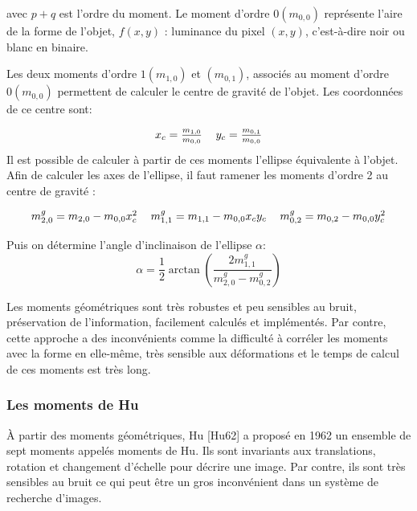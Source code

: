 avec $p+q$ est l'ordre du moment. Le moment d’ordre $0 (m_{0,0})$  représente l’aire de la forme de l'objet, $f(x, y)$ : luminance du pixel $(x, y)$, c’est-à-dire noir ou blanc en binaire.

Les deux moments d'ordre $1 (m_{1,0})$ et $(m_{0,1})$, associés au moment d’ordre $0 (m_{0,0})$ permettent de calculer le centre de gravité de l'objet. Les coordonnées de ce
centre sont:

\begin{equation}
		\begin{tabular}{cc}
		$x_{c} = \frac{m_{1,0}}{m_{0,0}}$ & $y_{c} = \frac{m_{0,1}}{m_{0,0}}$
		\end{tabular}
\end{equation}
Il est possible de calculer à partir de ces moments l’ellipse équivalente à l’objet. Afin de calculer les axes de l’ellipse, il faut ramener les moments d’ordre 2 au centre de gravité :

\begin{equation}
\begin{tabular}{ccc}
$m_{2, 0}^g = m_{2,0} - m_{0,0} x_{c}^2$ & $m_{1,1}^g = m_{1,1} - m_{0,0} x_{c}y_{c}$ 
& $m_{0,2}^g = m_{0,2} - m_{0,0} y_{c}^2$ 
\end{tabular}
\end{equation}

Puis on détermine l’angle d’inclinaison de l’ellipse $\alpha$:
\begin{equation}
    \alpha = \frac{1}{2} \arctan(\frac{2m_{1,1}^g}{m_{2, 0}^g-m_{0,2}^g})
\end{equation}

Les moments géométriques sont très robustes et peu sensibles au bruit, préservation de l’information, facilement calculés et implémentés. Par contre, cette approche a des inconvénients comme la difficulté à corréler les moments avec la forme en elle-même, très sensible aux déformations et le temps de calcul de ces moments est très long.

\subsubsection{Les  moments de Hu}
À partir des moments géométriques, Hu [Hu62] a proposé en 1962 un ensemble de sept moments appelés moments de Hu. Ils sont invariants aux translations, rotation et changement d’échelle pour décrire une image. Par contre, ils sont très sensibles au bruit ce qui peut être un gros inconvénient dans un système de recherche d’images.\\

